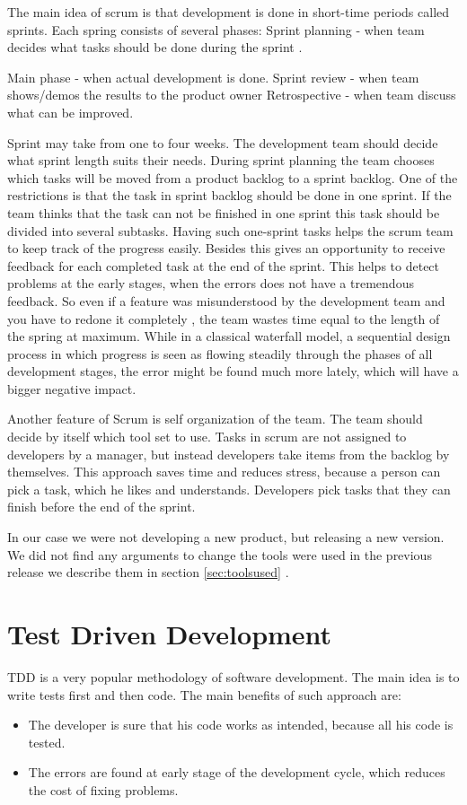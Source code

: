   The main idea of scrum is that development is done in short-time periods
  called sprints. Each spring consists of several phases:
  Sprint planning - when team decides what tasks should be done during the
  sprint .

  Main phase - when actual development is done.
  Sprint review - when team shows/demos the results to the product owner
  Retrospective - when team discuss what can be improved.


  Sprint may take from one to four weeks. The development team should decide
  what sprint length suits their needs. During sprint planning the team chooses
  which tasks will be moved from a product backlog to a sprint backlog.
  One of the restrictions is that the task in sprint backlog should be done in one sprint.
  If the team thinks that the task can not be finished in one sprint this task
  should be divided into several subtasks. 
  Having such one-sprint tasks helps the scrum team to keep track of the
  progress easily. Besides this gives an opportunity to receive feedback for each completed task at the end
  of the sprint. This helps to detect problems at the early stages, when
  the errors does not have a tremendous feedback. So even if a feature was misunderstood by the development team
  and you have to redone it completely , the team wastes time equal to the
  length of the spring at maximum. While in a classical waterfall model, a sequential design process in which
  progress is seen as flowing steadily through the phases of all development stages, 
  the error might be found much more lately, which will have a bigger negative impact.

  Another feature of Scrum is self organization of the team. The team should
  decide by itself which tool set to use. Tasks in scrum are not assigned to
  developers by a manager, but instead developers take items from the backlog by themselves.
  This approach saves time and reduces stress, because a person can pick a task,
  which he likes and understands. Developers pick tasks that they
  can finish before the end of the sprint.

  In our case we were not developing a new product, but releasing a new version.
  We did not find any arguments to change the tools were used in the previous
  release we describe them in section \ref{sec:toolsused} .

  \section{Test Driven Development}
    TDD is a very popular methodology of software development. The main idea is to
    write tests first and then code. The main benefits of such approach are:
      \begin{itemize}
        \item The developer is sure that his code works as intended, because all
        his code is tested.
        \item The errors are found at early stage of the development cycle, which
        reduces the cost of fixing problems.
      \end{itemize}
      
